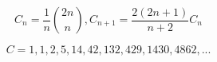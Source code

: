 \[ C_n=\frac{1}{n}\binom{2n}{n}, C_{n+1}=\frac{2(2n+1)}{n+2}C_n \] \par
\[C = 1, 1, 2, 5, 14, 42, 132, 429, 1430, 4862, ... \]
